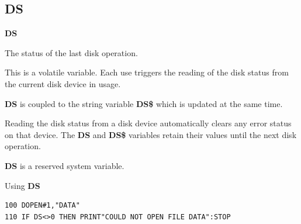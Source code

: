 
\newpage
\subsection{DS}
\begin{description}[leftmargin=2cm,style=nextline]
\item [Format:] {\bf DS}
\item [Usage:]  The status of the last disk operation.

                This is a volatile variable.
                Each use triggers the reading of the disk status
                from the current disk device in usage.

                {\bf DS} is coupled to the string variable {\bf DS\$}
                which is updated at the same time.

                Reading the disk status from a disk device automatically
                clears any error status on that device. The {\bf DS} and
                {\bf DS\$} variables retain their values until the next disk
                operation.

\item[Remarks:] {\bf DS} is a reserved system variable.
\item [Example:] Using {\bf DS}
\begin{tcolorbox}[colback=black,coltext=white]
\verbatimfont{\codefont}
\begin{verbatim}
100 DOPEN#1,"DATA"
110 IF DS<>0 THEN PRINT"COULD NOT OPEN FILE DATA":STOP
\end{verbatim}
\end{tcolorbox}
\end{description}


\newpage
